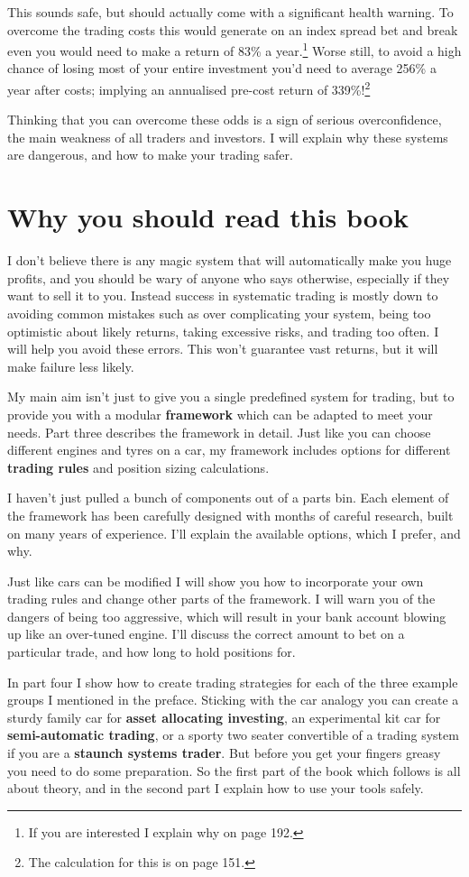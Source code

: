 This sounds safe, but should actually come with a significant health warning. To overcome the trading costs this would generate on an index spread bet and break even you would need to make a return of 83\% a year.\footnote{If you are interested I explain why on page 192.} Worse still, to avoid a high chance of losing most of your entire investment you'd need to average 256\% a year after costs; implying an annualised pre-cost return of 339\%!\footnote{The calculation for this is on page 151.}

Thinking that you can overcome these odds is a sign of serious overconfidence, the main weakness of all traders and investors. I will explain why these systems are dangerous, and how to make your trading safer.

\section*{Why you should read this book}  {}

I don't believe there is any magic system that will automatically make you huge profits, and you should be wary of anyone who says otherwise, especially if they want to sell it to you. Instead success in systematic trading is mostly down to avoiding common mistakes such as over complicating your system, being too optimistic about likely returns, taking excessive risks, and trading too often. I will help you avoid these errors. This won't guarantee vast returns, but it will make failure less likely.

My main aim isn't just to give you a single predefined system for trading, but to provide you with a modular \textbf{framework} which can be adapted to meet your needs. Part three describes the framework in detail. Just like you can choose different engines and tyres on a car, my framework includes options for different \textbf{trading rules} and position sizing calculations.

I haven't just pulled a bunch of components out of a parts bin. Each element of the framework has been carefully designed with months of careful research, built on many years of experience. I'll explain the available options, which I prefer, and why.

Just like cars can be modified I will show you how to incorporate your own trading rules and change other parts of the framework. I will warn you of the dangers of being too aggressive, which will result in your bank account blowing up like an over-tuned engine. I'll discuss the correct amount to bet on a particular trade, and how long to hold positions for.

In part four I show how to create trading strategies for each of the three example groups I mentioned in the preface. Sticking with the car analogy you can create a sturdy family car for \textbf{asset allocating investing}, an experimental kit car for \textbf{semi-automatic trading}, or a sporty two seater convertible of a trading system if you are a \textbf{staunch systems trader}. But before you get your fingers greasy you need to do some preparation. So the first part of the book which follows is all about theory, and in the second part I explain how to use your tools safely.
